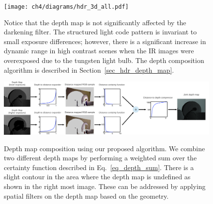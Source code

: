 \begin{figure}
\centering
\texttt{[image: ch4/diagrams/hdr\_3d\_all.pdf]} 
\caption{Notice that the depth map is not significantly affected by the darkening filter. The structured light code pattern is invariant to small exposure differences; however, there is a significant increase in dynamic range in high contrast scenes when the IR images were overexposed due to the tungsten light bulb. The depth composition algorithm is described in Section~\ref{sec_hdr_depth_map}.}

\label{fig_all_camera}
\end{figure}
\begin{figure}
\centering
\includegraphics[width=7in]{ch4/diagrams/jason_hdr.pdf} 
\label{fig_jason_dep_hdr}
\caption{Depth map composition using our proposed algorithm. We combine two different depth maps by performing a weighted sum over the certainty function described in Eq.~\ref{eq_depth_sum}. There is a slight contour in the area where the depth map is undefined as shown in the right most image. These can be addressed by applying spatial filters on the depth map based on the geometry.}
\end{figure}
